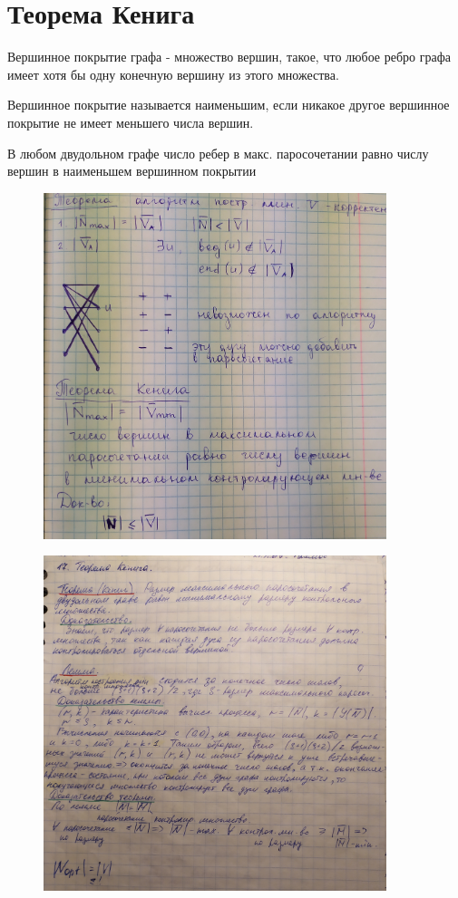 \documentclass[discrete.tex]{subfiles}
\begin{document}
  \section{Теорема Кенига}

  \begin{definition}
      Вершинное покрытие графа - множество вершин, такое, что любое ребро графа
      имеет хотя бы одну конечную вершину из этого множества.
  \end{definition}

  \begin{definition}
      Вершинное покрытие называется наименьшим, если никакое другое вершинное покрытие не
      имеет меньшего числа вершин.
  \end{definition}

  \begin{theorem} [Кёнига]
      В любом двудольном графе число ребер в макс. паросочетании равно числу вершин в
      наименьшем вершинном покрытии
  \end{theorem}

  \begin{figure}[H]
          \includegraphics[width=10cm]{pics/50_1}
          \centering
  \end{figure}

  \begin{figure}[H]
          \includegraphics[width=10cm]{pics/50_2}
          \centering
  \end{figure}
\end{document}
